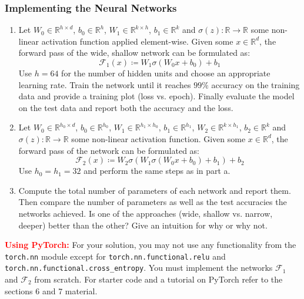 \documentclass{article}
\begin{document}
\begin{aprob}
    \subsubsection*{Implementing the Neural Networks}
    \begin{enumerate}
        \item {}
        Let $W_0 \in \mathbb{R}^{h \times d}$, $b_0 \in \mathbb{R}^h$, $W_1 \in \mathbb{R}^{k \times h}$, $b_1 \in \mathbb{R}^k$ and $\sigma(z)\colon \mathbb{R} \to \mathbb{R}$
        some non-linear activation function applied element-wise. Given some $x \in \mathbb{R}^{d}$, the forward pass of the wide, shallow network can be formulated as:
        $$\mathcal{F}_1(x) \coloneqq W_1 \sigma(W_0 x + b_0) + b_1$$
        Use $h=64$ for the number of hidden units and choose an appropriate learning rate.
        Train the network until it reaches $99\%$ accuracy on the training data and provide a training plot (loss vs. epoch).
        Finally evaluate the model on the test data and report both the accuracy and the loss.
        \item {}
        Let $W_0 \in \mathbb{R}^{h_0 \times d}$, $b_0 \in \mathbb{R}^{h_0}$, $W_1 \in \mathbb{R}^{h_1 \times h_0}$, $b_1 \in \mathbb{R}^{h_1}$,
        $W_2 \in \mathbb{R}^{k \times h_1}$, $b_2 \in \mathbb{R}^{k}$ and $\sigma(z) : \mathbb{R} \rightarrow \mathbb{R}$
        some non-linear activation function. Given some $x \in \mathbb{R}^{d}$, the forward pass of the network can be formulated as:
        $$\mathcal{F}_2(x) \coloneqq W_2 \sigma(W_1 \sigma(W_0 x + b_0) + b_1) + b_2$$
        Use $h_0 = h_1 = 32$ and perform the same steps as in part a.
        \item {}
        Compute the total number of parameters of each network and report them.
        Then compare the number of parameters as well as the test accuracies the networks achieved. Is one of the approaches (wide, shallow vs. narrow, deeper) better than the other? Give
        an intuition for why or why not.
    \end{enumerate}
    
    \textcolor{red}{\textbf{Using PyTorch:}} For your solution, you may not use any functionality from the \texttt{torch.nn} module except for \texttt{torch.nn.functional.relu} and \texttt{torch.nn.functional.cross\_entropy}. You must implement the networks $\mathcal{F}_1$ and $\mathcal{F}_2$ from scratch. For starter code and a tutorial on PyTorch refer to the sections 6 and 7 material.

\end{aprob}
\end{document}
